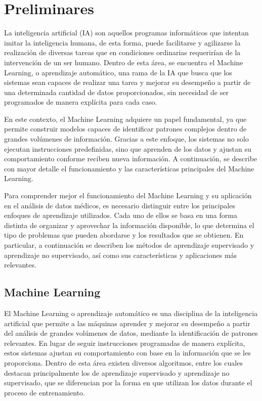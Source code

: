 \documentclass{article}
\begin{document}

\section{Preliminares}

La inteligencia artificial (IA) son aquellos programas informáticos que intentan imitar la inteligencia humana, de esta forma, puede facilitarse y agilizarse la realización de diversas tareas que en condiciones ordinarias requerirían de la intervención de un ser humano. Dentro de esta área, se encuentra el Machine Learning, o aprendizaje automático, una rama de la IA que busca que los sistemas sean capaces de realizar una tarea y mejorar su desempeño a partir de una determinada cantidad de datos proporcionados, sin necesidad de ser programados de manera explícita para cada caso.

En este contexto, el Machine Learning adquiere un papel fundamental, ya que permite construir modelos capaces de identificar patrones complejos dentro de grandes volúmenes de información. Gracias a este enfoque, los sistemas no solo ejecutan instrucciones predefinidas, sino que aprenden de los datos y ajustan su comportamiento conforme reciben nueva información. A continuación, se describe con mayor detalle el funcionamiento y las características principales del Machine Learning.

Para comprender mejor el funcionamiento del Machine Learning y su aplicación en el análisis de datos médicos, es necesario distinguir entre los principales enfoques de aprendizaje utilizados. Cada uno de ellos se basa en una forma distinta de organizar y aprovechar la información disponible, lo que determina el tipo de problemas que pueden abordarse y los resultados que se obtienen. En particular, a continuación se describen los métodos de aprendizaje supervisado y aprendizaje no supervisado, así como sus características y aplicaciones más relevantes.

    \subsection {Machine Learning}
    
    El Machine Learning o aprendizaje automático es una disciplina de la inteligencia artificial que permite a las máquinas aprender y mejorar su desempeño a partir del análisis de grandes volúmenes de datos, mediante la identificación de patrones relevantes. En lugar de seguir instrucciones programadas de manera explícita, estos sistemas ajustan su comportamiento con base en la información que se les proporciona. Dentro de esta área existen diversos algoritmos, entre los cuales destacan principalmente los de aprendizaje supervisado y aprendizaje no supervisado, que se diferencian por la forma en que utilizan los datos durante el proceso de entrenamiento.
\end{document}
